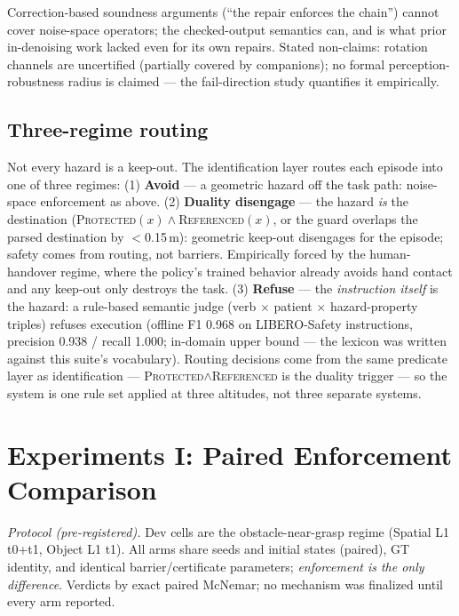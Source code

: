 \documentclass[conference]{IEEEtran}
\begin{document}
Correction-based soundness arguments (``the repair enforces the chain'') cannot cover noise-space operators; the checked-output semantics can, and is what prior in-denoising work lacked even for its own repairs. Stated non-claims: rotation channels are uncertified (partially covered by companions); no formal perception-robustness radius is claimed --- the fail-direction study quantifies it empirically.

\subsection{Three-regime routing}
\label{sec:routing}

Not every hazard is a keep-out. The identification layer routes each episode into one of three regimes:
(1) \textbf{Avoid} --- a geometric hazard off the task path: noise-space enforcement as above.
(2) \textbf{Duality disengage} --- the hazard \emph{is} the destination (\textsc{Protected}$(x)\wedge$\textsc{Referenced}$(x)$, or the guard overlaps the parsed destination by $<$0.15\,m): geometric keep-out disengages for the episode; safety comes from routing, not barriers. Empirically forced by the human-handover regime, where the policy's trained behavior already avoids hand contact and any keep-out only destroys the task.
(3) \textbf{Refuse} --- the \emph{instruction itself} is the hazard: a rule-based semantic judge (verb $\times$ patient $\times$ hazard-property triples) refuses execution (offline F1 0.968 on LIBERO-Safety instructions, precision 0.938 / recall 1.000; in-domain upper bound --- the lexicon was written against this suite's vocabulary).
Routing decisions come from the same predicate layer as identification --- \textsc{Protected}$\wedge$\textsc{Referenced} is the duality trigger --- so the system is one rule set applied at three altitudes, not three separate systems.

\section{Experiments I: Paired Enforcement Comparison}
\label{sec:pilots}

\emph{Protocol (pre-registered).} Dev cells are the obstacle-near-grasp regime (Spatial L1 t0+t1, Object L1 t1). All arms share seeds and initial states (paired), GT identity, and identical barrier/certificate parameters; \emph{enforcement is the only difference}. Verdicts by exact paired McNemar; no mechanism was finalized until every arm reported.
\end{document}
